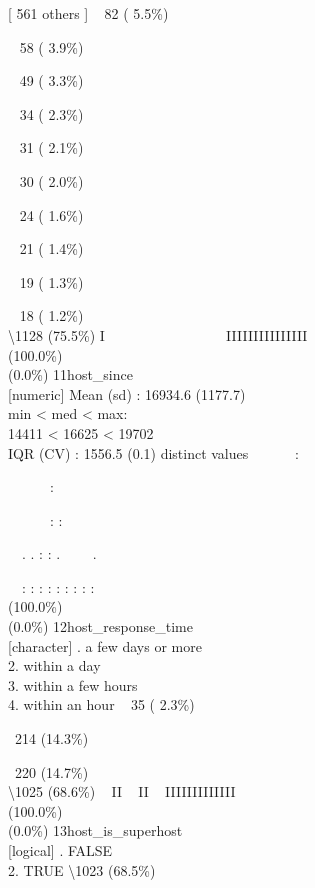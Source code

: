 \documentclass[
  journal,
]{IEEEtran}%
\begin{document}
{[} 561 others {]} \textbar~ 82 ( 5.5\%)\\
\strut ~ 58 ( 3.9\%)\\
\strut ~ 49 ( 3.3\%)\\
\strut ~ 34 ( 2.3\%)\\
\strut ~ 31 ( 2.1\%)\\
\strut ~ 30 ( 2.0\%)\\
\strut ~ 24 ( 1.6\%)\\
\strut ~ 21 ( 1.4\%)\\
\strut ~ 19 ( 1.3\%)\\
\strut ~ 18 ( 1.2\%)\\
\textbackslash1128 (75.5\%) \textbar{} \textbar I ~ ~ ~ ~ ~ ~ ~ ~ ~ ~
IIIIIIIIIIIIIII \\
(100.0\%) \\
(0.0\%) \textbar{} \textbar{} 11\textbar host\_since\\
{[}numeric{]} \textbar Mean (sd) : 16934.6 (1177.7)\\
min \textless{} med \textless{} max:\\
14411 \textless{} 16625 \textless{} 19702\\
IQR (CV) : 1556.5 (0.1)  distinct values \textbar{}
\textbar~~~~~~:\\
\strut ~~~~~~:\\
\strut ~~~~~~: :\\
\strut ~~. . : : . ~~~~.\\
\strut ~~: : : : : : : : : \\
(100.0\%) \\
(0.0\%) \textbar{} \textbar{} 12\textbar host\_response\_time\\
{[}character{]} . a few days or more\\
2. within a day\\
3. within a few hours\\
4. within an hour \textbar~ 35 ( 2.3\%)\\
\strut ~214 (14.3\%)\\
\strut ~220 (14.7\%)\\
\textbackslash1025 (68.6\%) \textbar{} \textbar~ II ~ II ~ IIIIIIIIIIIII
\\
(100.0\%) \\
(0.0\%) \textbar{} \textbar{} 13\textbar host\_is\_superhost\\
{[}logical{]} . FALSE\\
2. TRUE \textbar\textbackslash1023 (68.5\%)\\
\end{document}
